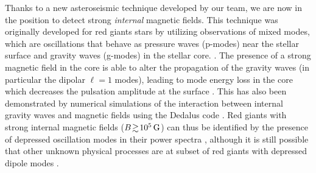 Thanks to a new asteroseismic technique developed by our team, we are now in the position to detect strong {\it internal} magnetic fields. This technique was originally developed for red giants stars by utilizing observations of mixed modes, which are oscillations that behave as pressure waves (p-modes) near the stellar surface and gravity waves (g-modes) in the stellar core. \citep[e.g][]{Beck_2011}. The presence of a strong magnetic field in the core is able to alter the propagation of the gravity waves (in particular the dipolar $\ell =1$ modes),
leading to mode energy loss in the core which decreases the pulsation amplitude at the surface \citep{Fuller_2015}. This has also been demonstrated by numerical simulations of the interaction between internal gravity waves and magnetic fields using the Dedalus code \citep{Lecoanet_2016}. Red giants with strong internal magnetic fields ($B \! \gtrsim \! 10^5 \, {\rm G}$) can thus be identified by the presence of depressed oscillation modes in their power spectra \citep{Fuller_2015,Stello_2016}, 
although it is still possible that other unknown physical processes are at  subset of red giants with depressed dipole modes \citet{Mosser_2017}.
